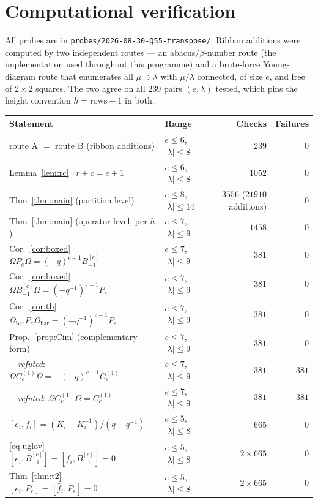 \documentclass[11pt]{article}
\theoremstyle{plain}
\theoremstyle{definition}
\newcommand{\Om}{\Omega}
\newcommand{\Ombar}{\Om_{\mathrm{bar}}}
\newcommand{\qq}{(q-q^{-1})}
\newcommand{\Bm}{B_{-1}^{[e]}}
\newcommand{\Ce}{C_e^{(1)}}
\begin{document}
\section{Computational verification}
\label{sec:tally}

All probes are in \texttt{probes/2026-08-30-Q55-transpose/}.  Ribbon additions
were computed by two independent routes --- an abacus/$\beta$-number route
(the implementation used throughout this programme) and a brute-force
Young-diagram route that enumerates all $\mu\supset\lambda$ with $\mu/\lambda$
connected, of size $e$, and free of $2\times2$ squares.  The two agree on all
$239$ pairs $(e,\lambda)$ tested, which pins the height convention
$h=\text{rows}-1$ in both.

\begin{center}
\begin{tabular}{llrr}
\hline
Statement & Range & Checks & Failures\\
\hline
route A $=$ route B (ribbon additions) & $e\le6$, $|\lambda|\le8$ & $239$ & $0$\\
Lemma~\ref{lem:rc} \ $r+c=e+1$ & $e\le6$, $|\lambda|\le8$ & $1052$ & $0$\\
Thm~\ref{thm:main} (partition level) & $e\le8$, $|\lambda|\le14$ & $3556$ ($21910$ additions) & $0$\\
Thm~\ref{thm:main} (operator level, per $h$) & $e\le7$, $|\lambda|\le9$ & $1458$ & $0$\\
Cor.~\ref{cor:boxed} \ $\Om P_e\Om=(-q)^{e-1}\Bm$ & $e\le7$, $|\lambda|\le9$ & $381$ & $0$\\
Cor.~\ref{cor:boxed} \ $\Om \Bm\Om=(-q^{-1})^{e-1}P_e$ & $e\le7$, $|\lambda|\le9$ & $381$ & $0$\\
Cor.~\ref{cor:tb} \ $\Ombar P_e\Ombar=(-q^{-1})^{e-1}P_e$ & $e\le7$, $|\lambda|\le9$ & $381$ & $0$\\
Prop.~\ref{prop:Cim} (complementary form) & $e\le7$, $|\lambda|\le9$ & $381$ & $0$\\
\ \ \emph{refuted}: $\Om\Ce\Om=-(-q)^{e-1}\Ce$ & $e\le7$, $|\lambda|\le9$ & $381$ & $381$\\
\ \ \emph{refuted}: $\Om\Ce\Om=\overline{\Ce}$ & $e\le7$, $|\lambda|\le9$ & $381$ & $381$\\
\hline
$[e_i,f_i]=(K_i-K_i^{-1})/\qq$ & $e\le5$, $|\lambda|\le8$ & $665$ & $0$\\
\eqref{eq:uglov} \ $[e_i,\Bm]=[f_i,\Bm]=0$ & $e\le5$, $|\lambda|\le8$ & $2\times665$ & $0$\\
Thm~\ref{thm:t2} \ $[\bar e_i,P_e]=[\bar f_i,P_e]=0$ & $e\le5$, $|\lambda|\le8$ & $2\times665$ & $0$\\

\end{tabular}
\end{center}
\end{document}
